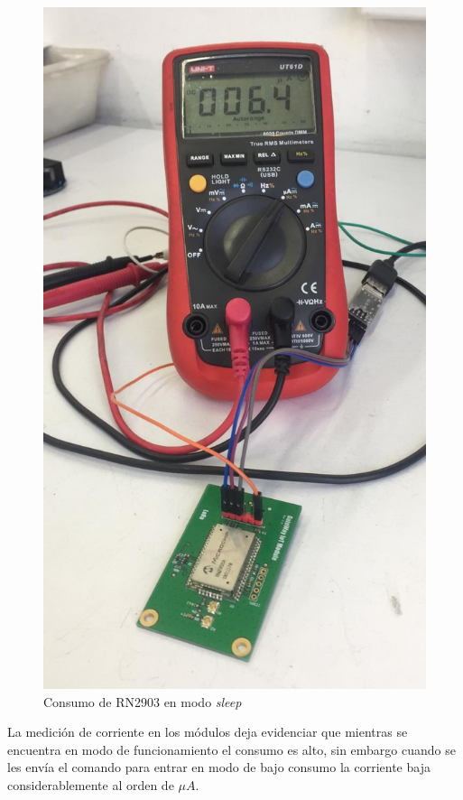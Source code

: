 \begin{figure}[H]
	\centering
	\includegraphics[scale=.15]{./Figures/ConsumoLoraSleep.jpeg}
	\caption{Consumo de RN2903 en modo \textit{sleep}}
	\label{fig:ConsumoLoraSleep}
\end{figure}

La medición de corriente en los módulos deja evidenciar que mientras se encuentra en modo de funcionamiento el consumo es alto, sin embargo cuando se les envía el comando para entrar en modo de bajo consumo la corriente baja considerablemente al orden de $\mu{A}$.


